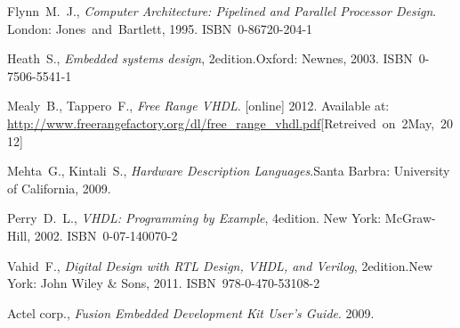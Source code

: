 \documentclass[12pt,a4paper]{article} %
\begin{document}
	
	\clearpage
	{\raggedright
	\begin{thebibliography}{9}
			Flynn~M.~J.,
			\textit{Computer Architecture: Pipelined and Parallel Processor Design}.
			\linebreak[3]
			London: Jones~and~Bartlett, 1995. ISBN~0-86720-204-1
		
			Heath~S.,
			\textit{Embedded systems design}, 2\nd edition.\linebreak[3]
			Oxford: Newnes, 2003. ISBN~0-7506-5541-1
		
			Mealy~B., Tappero~F.,
			\textit{Free Range VHDL}. [online]
			2012. \linebreak[2]
			Available at: \url{http://www.freerangefactory.org/dl/free_range_vhdl.pdf}\linebreak[2]
			\mbox{[Retreived on 2\nd May, 2012]}
		
			Mehta~G., Kintali~S.,
			\textit{Hardware Description Languages}.\linebreak[2]
			Santa Barbra: University of California,
			2009.
		
		
			Perry~D.~L.,
			\textit{VHDL: Programming by Example}, 4\nth edition. \linebreak[2]
			New York: McGraw-Hill, 2002. ISBN~0-07-140070-2
		
			Vahid~F.,
			\textit{Digital Design with RTL Design, VHDL, and Verilog}, 2\nd edition.\linebreak[2]
			New York: %
			John Wiley \& Sons, 2011. ISBN~978-0-470-53108-2
		
			Actel corp.,
			\textit{Fusion Embedded Development Kit User's Guide}. %
			2009.
		

\end{thebibliography}}
\end{document}
